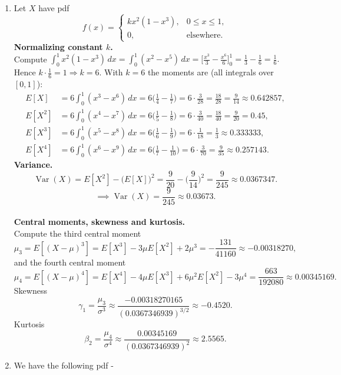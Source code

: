 \chapter{}
\begin{enumerate}
    \item Let \(X\) have pdf
\[
f(x)=\begin{cases}
k x^{2}(1-x^{3}), & 0\le x\le 1,\\[4pt]
0, & \text{elsewhere.}
\end{cases}
\]
\textbf{Normalizing constant \(k\).} \\
Compute \(\displaystyle\int_0^1 x^{2}(1-x^{3})\,dx=\int_0^1 (x^2-x^5)\,dx=\Big[\tfrac{x^3}{3}-\tfrac{x^6}{6}\Big]_0^1=\tfrac{1}{3}-\tfrac{1}{6}=\tfrac{1}{6}.\)  
Hence \(k\cdot \tfrac{1}{6}=1\Rightarrow \boxed{k=6}.\)
With \(k=6\) the moments are (all integrals over \([0,1]\)):
\[
\begin{aligned}
E[X] &= 6\int_0^1 (x^3-x^6)\,dx
=6\Big(\tfrac{1}{4}-\tfrac{1}{7}\Big)
=6\cdot\tfrac{3}{28}=\tfrac{18}{28}=\boxed{\tfrac{9}{14}\approx 0.642857},\\[6pt]
E[X^2] &= 6\int_0^1 (x^4-x^7)\,dx
=6\Big(\tfrac{1}{5}-\tfrac{1}{8}\Big)
=6\cdot\tfrac{3}{40}=\tfrac{18}{40}=\boxed{\tfrac{9}{20}=0.45},\\[6pt]
E[X^3] &= 6\int_0^1 (x^5-x^8)\,dx
=6\Big(\tfrac{1}{6}-\tfrac{1}{9}\Big)
=6\cdot\tfrac{1}{18}=\boxed{\tfrac{1}{3}\approx 0.333333},\\[6pt]
E[X^4] &= 6\int_0^1 (x^6-x^9)\,dx
=6\Big(\tfrac{1}{7}-\tfrac{1}{10}\Big)
=6\cdot\tfrac{3}{70}=\boxed{\tfrac{9}{35}\approx 0.257143}.
\end{aligned}
\]
\textbf{Variance.} \\
\[
\operatorname{Var}(X)=E[X^2]-\big(E[X]\big)^2=\frac{9}{20}-\Big(\frac{9}{14}\Big)^2
=\frac{9}{245}\approx 0.0367347.
\]
\[\boxed{\implies \operatorname{Var}(X)=\dfrac{9}{245}\approx 0.03673.}\] \\ 
\textbf{Central moments, skewness and kurtosis.} \\
Compute the third central moment
\[
\mu_3=E[(X-\mu)^3]=E[X^3]-3\mu E[X^2]+2\mu^3
= -\frac{131}{41160}\approx -0.00318270,
\]
and the fourth central moment
\[
\mu_4=E[(X-\mu)^4]=E[X^4]-4\mu E[X^3]+6\mu^2 E[X^2]-3\mu^4
=\frac{663}{192080}\approx 0.00345169.
\]
Skewness
\[
\gamma_1=\frac{\mu_3}{\sigma^3}
\approx \frac{-0.00318270165}{(0.0367346939)^{3/2}}
\approx \boxed{-0.4520}.
\]
Kurtosis
\[\beta_2=\frac{\mu_4}{\sigma^4}
\approx \frac{0.00345169}{(0.0367346939)^{2}}
\approx \boxed{2.5565}.
\]
    \item We have the following pdf - 

\end{enumerate}
